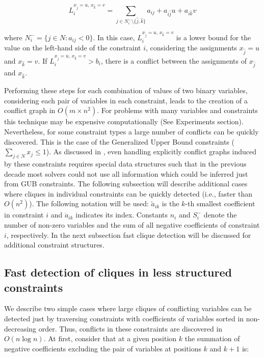 \documentclass{endm}
\begin{document}
\begin{equation}\label{li}
L_{i}^{x_{\hat{j}} = u,\, x_{\hat{k}} = v}=\sum_{j\in N_{i}^{-} \setminus \{\hat{j}, \hat{k}\}}a_{ij}+a_{i\hat{j}}u+a_{i\hat{k}}v 
\end{equation}

\noindent where $N_{i}^{-} = \{j \in N : a_{ij} < 0\}$. In this case, $L_{i}^{x_{\hat{j}} = u,\, x_{\hat{k}} = v}$ is a lower bound for the value on the left-hand side  of the constraint $i$, considering the assignments $x_{\hat{j}} = u$ and $x_{\hat{k}} = v$. If $L_{i}^{x_{\hat{j}} = u,\, x_{\hat{k}} = v} > b_{i}$, there is a conflict between the assignments of $x_{\hat{j}}$ and $x_{\hat{k}}$. 

Performing these steps for each combination of values of two binary variables, considering each pair of variables in each constraint, leads to the creation of a conflict graph in $O(m \times n^2)$. For problems with many variables and constraints this technique may be expensive computationally (See Experiments section). Nevertheless, for some constraint types a large number of conflicts can be quickly discovered. This is the case of the Generalized Upper Bound constraints ($\sum_{j\in N}x_j \leq 1$). As discussed in \cite{atamturk}, even handling explicitly conflict graphs induced by these constraints requires special data structures such that in the previous decade most solvers could not use all information which could be inferred just from GUB constraints. The following subsection will describe additional cases where cliques in individual constraints can be quickly detected (i.e., faster than $O(n^2)$). The following notation will be used: $\tilde{a}_{ik}$ is the $k$-th smallest coefficient in constraint $i$ and $\acute{a}_{ik}$ indicates its index. Constants $n_i$ and $S_i^-$ denote the number of non-zero variables and the sum of all negative coefficients of constraint $i$, respectively. In the next subsection fast clique detection will be discussed for additional constraint structures.


\subsection{Fast detection of cliques in less structured constraints}

We describe two simple cases where large cliques of conflicting variables can be detected just by traversing constraints with  coefficients of variables sorted in non-decreasing order. Thus, conflicts in these constraints are discovered in $O( n \log n)$. At first, consider that at a given position $k$ the summation of negative coefficients excluding the pair of variables at positions $k$ and $k+1$ is: 
\end{document}
